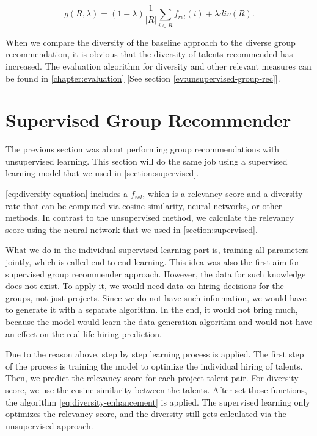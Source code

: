 \begin{equation}
g ( R , \lambda ) = ( 1 - \lambda ) \frac { 1 } { | R | } \sum _ { i \in R } f _ { r e l } ( i ) + \lambda d i v ( R ) .
\label{eq:diversity-equation}
\end{equation}

When we compare the diversity of the baseline approach to the diverse group recommendation, it is obvious that the diversity of talents recommended has increased. The evaluation algorithm for diversity and other relevant measures can be found in \autoref{chapter:evaluation} [See section \ref{ev:unsupervised-group-rec}].

\section{Supervised Group Recommender}\label{section:supervised-group-rec}

The previous section was about performing group recommendations with unsupervised learning. This section will do the same job using a supervised learning model that we used in \autoref{section:supervised}.


\autoref{eq:diversity-equation} includes a $f _ { rel } $, which is a relevancy score and a diversity rate that can be computed via cosine similarity, neural networks, or other methods. In contrast to the unsupervised method, we calculate the relevancy score using the neural network that we used in \autoref{section:supervised}.

What we do in the individual supervised learning part is, training all parameters jointly, which is called end-to-end learning. This idea was also the first aim for supervised group recommender approach. However, the data for such knowledge does not exist. To apply it, we would need data on hiring decisions for the groups, not just projects. Since we do not have such information, we would have to generate it with a separate algorithm. In the end, it would not bring much, because the model would learn the data generation algorithm and would not have an effect on the real-life hiring prediction.


Due to the reason above, step by step learning process is applied. The first step of the process is training the model to optimize the individual hiring of talents. Then, we predict the relevancy score for each project-talent pair. For diversity score, we use the cosine similarity between the talents. After set those functions, the algorithm \ref{eq:diversity-enhancement} is applied. The supervised learning only optimizes the relevancy score, and the diversity still gets calculated via the unsupervised approach.


